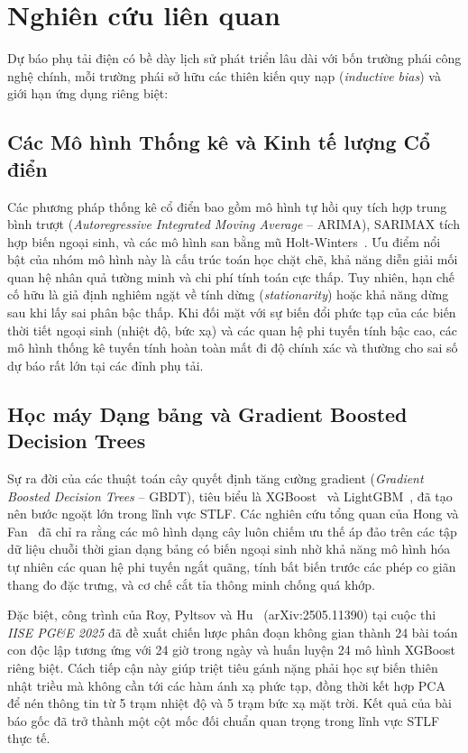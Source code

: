 \section{Nghiên cứu liên quan}
\label{sec:related_work}

Dự báo phụ tải điện có bề dày lịch sử phát triển lâu dài với bốn trường phái công nghệ chính, mỗi trường phái sở hữu các thiên kiến quy nạp (\textit{inductive bias}) và giới hạn ứng dụng riêng biệt:

\subsection{Các Mô hình Thống kê và Kinh tế lượng Cổ điển}
Các phương pháp thống kê cổ điển bao gồm mô hình tự hồi quy tích hợp trung bình trượt (\textit{Autoregressive Integrated Moving Average} -- ARIMA), SARIMAX tích hợp biến ngoại sinh, và các mô hình san bằng mũ Holt-Winters~\cite{hyndman2018forecasting}. Ưu điểm nổi bật của nhóm mô hình này là cấu trúc toán học chặt chẽ, khả năng diễn giải mối quan hệ nhân quả tường minh và chi phí tính toán cực thấp. Tuy nhiên, hạn chế cố hữu là giả định nghiêm ngặt về tính dừng (\textit{stationarity}) hoặc khả năng dừng sau khi lấy sai phân bậc thấp. Khi đối mặt với sự biến đổi phức tạp của các biến thời tiết ngoại sinh (nhiệt độ, bức xạ) và các quan hệ phi tuyến tính bậc cao, các mô hình thống kê tuyến tính hoàn toàn mất đi độ chính xác và thường cho sai số dự báo rất lớn tại các đỉnh phụ tải.

\subsection{Học máy Dạng bảng và Gradient Boosted Decision Trees}
Sự ra đời của các thuật toán cây quyết định tăng cường gradient (\textit{Gradient Boosted Decision Trees} -- GBDT), tiêu biểu là XGBoost~\cite{chen2016xgboost} và LightGBM~\cite{ke2017lightgbm}, đã tạo nên bước ngoặt lớn trong lĩnh vực STLF. Các nghiên cứu tổng quan của Hong và Fan~\cite{hong2016probabilistic} đã chỉ ra rằng các mô hình dạng cây luôn chiếm ưu thế áp đảo trên các tập dữ liệu chuỗi thời gian dạng bảng có biến ngoại sinh nhờ khả năng mô hình hóa tự nhiên các quan hệ phi tuyến ngắt quãng, tính bất biến trước các phép co giãn thang đo đặc trưng, và cơ chế cắt tỉa thông minh chống quá khớp.

Đặc biệt, công trình của Roy, Pyltsov và Hu~\cite{roy2025hourly} (arXiv:2505.11390) tại cuộc thi \textit{IISE PG\&E 2025} đã đề xuất chiến lược phân đoạn không gian thành 24 bài toán con độc lập tương ứng với 24 giờ trong ngày và huấn luyện 24 mô hình XGBoost riêng biệt. Cách tiếp cận này giúp triệt tiêu gánh nặng phải học sự biến thiên nhật triều mà không cần tới các hàm ánh xạ phức tạp, đồng thời kết hợp PCA để nén thông tin từ 5 trạm nhiệt độ và 5 trạm bức xạ mặt trời. Kết quả của bài báo gốc đã trở thành một cột mốc đối chuẩn quan trọng trong lĩnh vực STLF thực tế.

